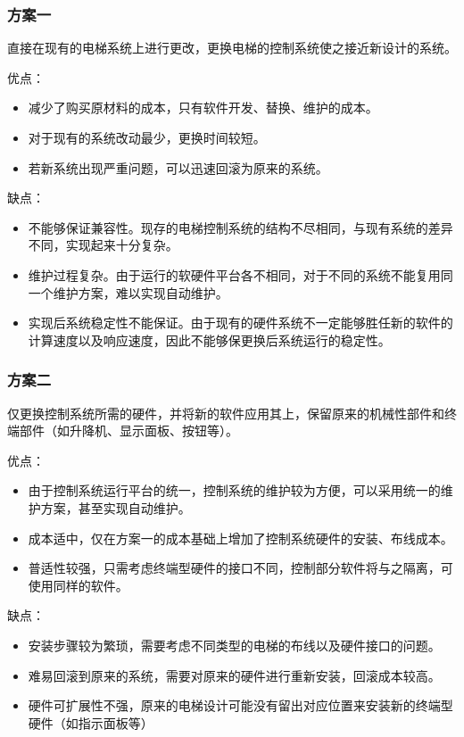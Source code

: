 \subsubsection{方案一}
直接在现有的电梯系统上进行更改，更换电梯的控制系统使之接近新设计的系统。\par
优点：\par
\begin{itemize}
	\item 减少了购买原材料的成本，只有软件开发、替换、维护的成本。
	\item 对于现有的系统改动最少，更换时间较短。
	\item 若新系统出现严重问题，可以迅速回滚为原来的系统。
\end{itemize} \par
缺点：\par
\begin{itemize}
	\item 不能够保证兼容性。现存的电梯控制系统的结构不尽相同，与现有系统的差异不同，实现起来十分复杂。
	\item 维护过程复杂。由于运行的软硬件平台各不相同，对于不同的系统不能复用同一个维护方案，难以实现自动维护。
	\item 实现后系统稳定性不能保证。由于现有的硬件系统不一定能够胜任新的软件的计算速度以及响应速度，因此不能够保更换后系统运行的稳定性。
\end{itemize}

\subsubsection{方案二}
仅更换控制系统所需的硬件，并将新的软件应用其上，保留原来的机械性部件和终端部件（如升降机、显示面板、按钮等）。\par
优点：\par
\begin{itemize}
	\item 由于控制系统运行平台的统一，控制系统的维护较为方便，可以采用统一的维护方案，甚至实现自动维护。
	\item 成本适中，仅在方案一的成本基础上增加了控制系统硬件的安装、布线成本。
	\item 普适性较强，只需考虑终端型硬件的接口不同，控制部分软件将与之隔离，可使用同样的软件。
\end{itemize}
缺点：\par
\begin{itemize}
	\item 安装步骤较为繁琐，需要考虑不同类型的电梯的布线以及硬件接口的问题。
	\item 难易回滚到原来的系统，需要对原来的硬件进行重新安装，回滚成本较高。
	\item 硬件可扩展性不强，原来的电梯设计可能没有留出对应位置来安装新的终端型硬件（如指示面板等）
\end{itemize}

